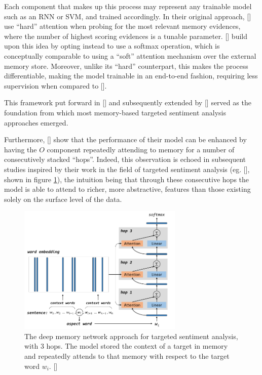 \documentclass[12pt, a4paper]{report}
\theoremstyle{definition}
\theoremstyle{definition}%
\theoremstyle{definition}%
\theoremstyle{definition}%
\theoremstyle{definition}%
\theoremstyle{definition}%
\renewcommand{\cite}[1]{[\citealp{#1}]}
\begin{document}
Each component that makes up this process may represent any trainable model such as an RNN or SVM, and trained accordingly. In their original approach, \cite{jasonweston2014} use \enquote{hard} attention when probing for the most relevant memory evidences, where the number of highest scoring evidences is a tunable parameter. \cite{sukhbaatar2015} build upon this idea by opting instead to use a softmax operation, which is conceptually comparable to using a \enquote{soft} attention mechanism over the external memory store. Moreover, unlike its \enquote{hard} counterpart, this makes the process differentiable, making the model trainable in an end-to-end fashion, requiring less supervision when compared to \cite{jasonweston2014}. 

This framework put forward in \cite{jasonweston2014} and subsequently extended by \cite{sukhbaatar2015} served as the foundation from which most memory-based targeted sentiment analysis approaches emerged. 


Furthermore, \cite{sukhbaatar2015} show that the performance of their model can be enhanced by having the $O$ component repeatedly attending to memory for a number of consecutively stacked \enquote{hops}. Indeed, this observation is echoed in subsequent studies inspired by their work in the field of targeted sentiment analysis (eg. \cite{tang2016}, shown in figure \ref{fig:tang_memory_network}), the intuition being that through these consecutive hops the model is able to attend to richer, more abstractive, features than those existing solely on the surface level of the data.

\begin{figure}[!ht]
    \centering
    \includegraphics[width=0.7\textwidth]{fyp_template/figures/tang_memory_network.png}
    \caption{The deep memory network approach for targeted sentiment analysis, with 3 hops. The model stored the context of a target in memory and repeatedly attends to that memory with respect to the target word $w_i$. \cite{tang2016}}
    \label{fig:tang_memory_network}
\end{figure}
\end{document}
